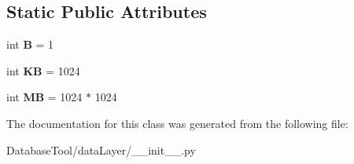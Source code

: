 \subsection*{Static Public Attributes}
\begin{DoxyCompactItemize}
\item 
\mbox{\label{classMIS_1_1DatabaseTool_1_1dataLayer_1_1sizeUnit__binary_adf09ff35ea05e4a0fe1fd4cc7de06b82}} 
int {\bfseries B} = 1
\item 
\mbox{\label{classMIS_1_1DatabaseTool_1_1dataLayer_1_1sizeUnit__binary_a8679fc031fa8c2573c6dbb8fbf1f2c7a}} 
int {\bfseries KB} = 1024
\item 
\mbox{\label{classMIS_1_1DatabaseTool_1_1dataLayer_1_1sizeUnit__binary_a1512d2afd68002c3704baa52972385d6}} 
int {\bfseries MB} = 1024 $\ast$ 1024
\end{DoxyCompactItemize}


The documentation for this class was generated from the following file\+:\begin{DoxyCompactItemize}
\item 
Database\+Tool/data\+Layer/\+\_\+\+\_\+init\+\_\+\+\_\+.\+py\end{DoxyCompactItemize}
